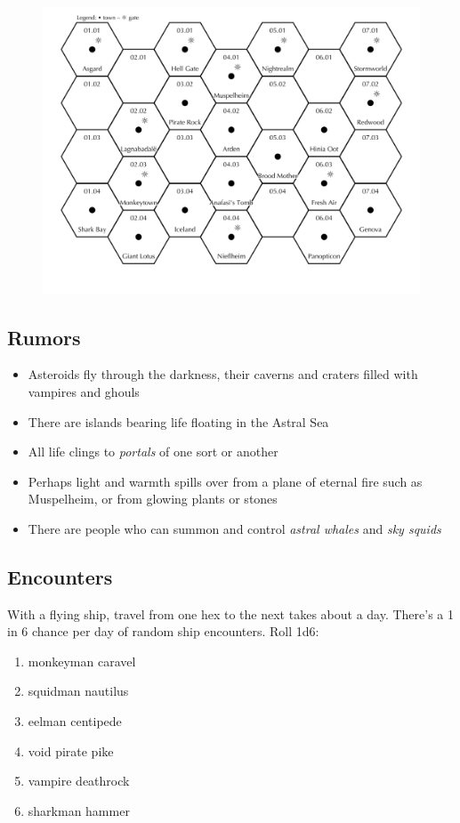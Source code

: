 \documentclass[11pt]{bxart}
\begin{document}
\begin{figure}
  \centering
  \includegraphics[width=15cm]{Astral-Sea.jpg}
\end{figure}

\subsection{Rumors}

\begin{itemize}
\item Asteroids fly through the darkness, their caverns and craters
  filled with vampires and ghouls
\item There are islands bearing life floating in the Astral Sea
\item All life clings to \textit{portals} of one sort or another
\item Perhaps light and warmth spills over from a plane of eternal
  fire such as Muspelheim, or from glowing plants or stones
\item There are people who can summon and control \textit{astral
  whales} and \textit{sky squids}
\end{itemize}

\subsection{Encounters}

With a flying ship, travel from one hex to the next takes about a day.
There's a 1 in 6 chance per day of random ship encounters. Roll 1d6:

\begin{enumerate}
\item monkeyman caravel
\item squidman nautilus
\item eelman centipede
\item void pirate pike
\item vampire deathrock 
\item sharkman hammer
\end{enumerate}
\end{document}
